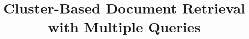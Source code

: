 \documentclass[sigconf,natbib=true,anonymous=true]{acmart}
\title{Cluster-Based Document Retrieval with Multiple Queries}
\begin{document}

\maketitle






\newpage
\balance


\end{document}
